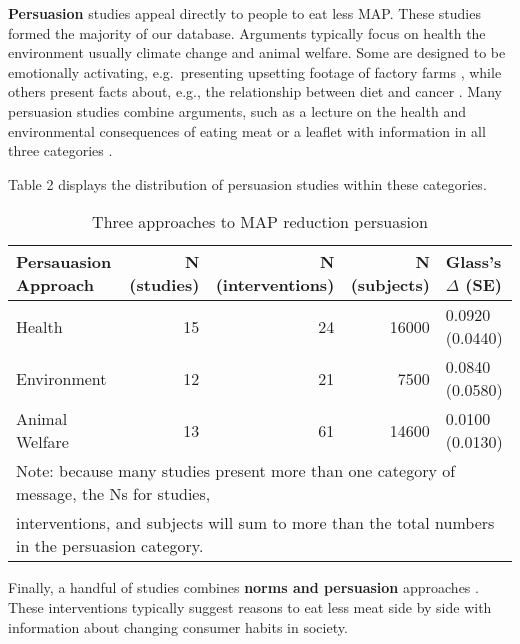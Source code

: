 \documentclass[sn-nature,pdflatex]{sn-jnl}
\begin{document}
\textbf{Persuasion} studies
\citep{kanchanachitra2020, abrahamse2007, acharya2004, berndsen2005, bertolaso2015, bianchi2022, bochmann2017, bschaden2020, carfora2023, cooney2016, fehrenbach2015, feltz2022, haile2021, hatami2018, hennessy2016, mathur2021effectiveness, norris2014, peacock2017, polanco2022, sparkman2021, jalil2023, merrill2009, weingarten2022}
appeal directly to people to eat less MAP. These studies formed the
majority of our database. Arguments typically focus on health the
environment \textemdash usually climate change \textemdash and animal
welfare. Some are designed to be emotionally activating, e.g.~presenting
upsetting footage of factory farms \citep{bertolaso2015}, while others
present facts about, e.g., the relationship between diet and cancer
\citep{hatami2018}. Many persuasion studies combine arguments, such as a
lecture on the health and environmental consequences of eating meat
\citep{jalil2023} or a leaflet with information in all three categories
\citep{hennessy2016}.

Table 2 displays the distribution of persuasion studies within these
categories.

\begin{table}[!h]
\centering
\caption{\label{tab:tab:table_two}Three approaches to MAP reduction persuasion}
\centering
\begin{tabular}[t]{lrrrl}
\toprule
Persauasion Approach & N (studies) & N (interventions) & N (subjects) & Glass's $\Delta$ (SE)\\
\midrule
Health & 15 & 24 & 16000 & 0.0920 (0.0440)\\
Environment & 12 & 21 & 7500 & 0.0840 (0.0580)\\
Animal Welfare & 13 & 61 & 14600 & 0.0100 (0.0130)\\
\bottomrule
\multicolumn{5}{l}{\textsuperscript{} Note: because many studies present more than one category of message, the Ns for studies, \linebreak}\\
\multicolumn{5}{l}{interventions, and subjects will sum to more than the total numbers in the persuasion category.}\\
\end{tabular}
\end{table}

Finally, a handful of studies combines \textbf{norms and persuasion}
approaches \citep{hennessy2016, carfora2023, mattson2020, piester2020}.
These interventions typically suggest reasons to eat less meat side by
side with information about changing consumer habits in society.
\end{document}
